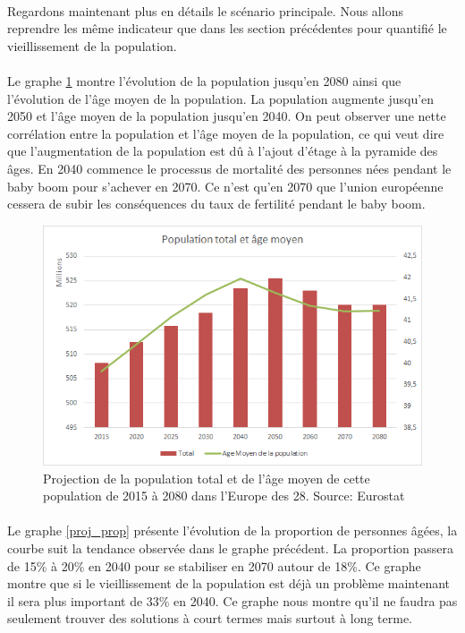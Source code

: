 \paragraph{}Regardons maintenant plus en détails le scénario principale. Nous allons reprendre les même indicateur que dans les section précédentes pour quantifié le vieillissement de la population. 

\paragraph{}Le graphe \ref{proj_pop} montre l’évolution de la population jusqu’en 2080 ainsi que l’évolution de l’âge moyen de la population. La population augmente jusqu’en 2050 et l’âge moyen de la population jusqu’en 2040. On peut observer une nette corrélation entre la population et l’âge moyen de la population, ce qui veut dire que l’augmentation de la population est dû à l’ajout d’étage à la pyramide des âges. En 2040 commence le processus de mortalité des personnes nées pendant le baby boom pour s’achever en 2070. Ce n’est qu’en 2070 que l’union européenne cessera de subir les conséquences du taux de fertilité pendant le baby boom. 


\begin{figure}[h!]
    \begin{center}
        \includegraphics[scale=0.7]{document/proj_pop.png}
        \caption{Projection de la population total et de l'âge moyen de cette population de 2015 à 2080 dans l'Europe des 28. Source: Eurostat\citep{eurostat_europop13}}
        \label{proj_pop}
    \end{center}
\end{figure}

\paragraph{}Le graphe \ref{proj_prop}  présente l’évolution de la proportion de personnes âgées, la courbe suit la tendance observée dans le graphe précédent. La proportion passera de 15\% à 20\% en 2040 pour se stabiliser en 2070 autour de 18\%. Ce graphe montre que si le vieillissement de la population est déjà un problème maintenant il sera plus important de 33\% en 2040. Ce graphe nous montre qu’il ne faudra pas seulement trouver des solutions à court termes mais surtout à long terme.

